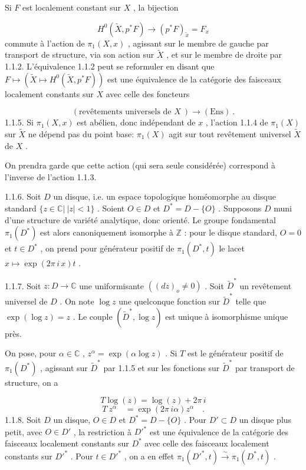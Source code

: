Si $F$ est localement constant sur $X$ , la bijection

\begin{equation}\tag{1.1.4.1}
H^{0}(\tilde{X}, p^{*} F) \longrightarrow (p^{*}F)_{\tilde{x}} = F_{x}
\end{equation}
commute à l'action de $\pi_1(X, x)$ , agissant sur le membre de gauche par transport de structure, via son action sur $\tilde{X}$ , et sur le membre de droite par 1.1.2. L'équivalence 1.1.2 peut se reformuler en disant que $F \longmapsto (\tilde{X} \longmapsto H^{0}(\tilde{X}, p^{*}F))$ est une équivalence de la catégorie des faisceaux localement constants sur $X$ avec celle des foncteurs

\begin{equation*}
(\text{revêtements universels de } X\ ) \longrightarrow (\mathrm{Ens})\ .
\end{equation*}
1.1.5. Si $\pi_1(X, x)$ est abélien, donc indépendant de $x$ , l'action 1.1.4 de $\pi_1(X)$ sur $\tilde{X}$ ne dépend pas du point base: $\pi_1(X)$ agit sur tout revêtement universel $\tilde{X}$ de $X$ .

On prendra garde que cette action (qui sera seule considérée) correspond à l'inverse de l'action 1.1.3.

1.1.6. Soit $D$ un disque, i.e. un espace topologique homéomorphe au disque standard $\{z \in \mathbb{C}|\ |z| < 1\}$ . Soient $O \in D$ et $D^{*} = D -\{O\}$ . Supposons $D$ muni d'une structure de variété analytique, donc orienté. Le groupe fondamental $\pi_1(D^{*})$ est alors canoniquement isomorphe à $\mathbb{Z}$ : pour le disque standard, $O = 0$ et $t \in D^{*}$ , on prend pour générateur positif de $\pi_1(D^{*}, t)$ le lacet $x \longmapsto \exp(2\pi\, i\, x)t$ .

1.1.7. Soit $z : D \to \mathbb{C}$ une uniformisante $((dz)_{o} \neq 0)$ . Soit $\tilde{D}^{*}$ un revêtement universel de $D$ . On note $\log z$ une quelconque fonction sur $\tilde{D}^{*}$ telle que
$\exp(\log z) = z$ . Le couple $(\tilde{D}^{*}, \log z)$ est unique à isomorphisme unique près.

On pose, pour $\alpha \in \mathbb{C}$ , $z^{\alpha} = \exp(\alpha \log z)$ . Si $T$ est le générateur positif de $\pi_1(D^{*})$ , agissant sur $\tilde{D}^{*}$ par 1.1.5 et sur les fonctions sur $\tilde{D}^{*}$ par transport de structure, on a

\begin{equation}\tag{1.1.7.1}
T \log(z) = \log(z) + 2\pi\, i
\end{equation}
\begin{equation}\tag{1.1.7.2}
T\ z^{\alpha} \quad = \exp(2\pi\, i\alpha)z^{\alpha} \quad .
\end{equation}
1.1.8. Soit $D$ un disque, $O \in D$ et $D^{*} = D-\{O\}$ . Pour $D' \subset D$ un disque plus petit, avec $O \in D'$ , la restriction à ${D'}^{*}$ est une équivalence de la catégorie des faisceaux localement constants sur $D^{*}$ avec celle des faisceaux localement constants sur ${D'}^{*}$ . Pour $t \in {D'}^{*}$ , on a en effet $\pi_1({D'}^{*}, t) \overset{\sim}{\longrightarrow} \pi_1(D^{*}, t)$ .

